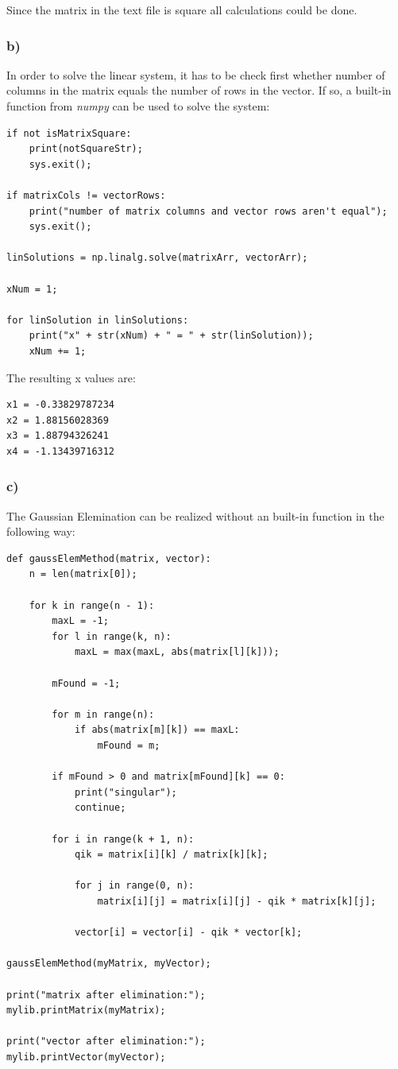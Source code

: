 Since the matrix in the text file is square all calculations could be done.


\subsubsection{b)}

In order to solve the linear system, it has to be check first whether number of columns in the matrix equals the number of rows in the vector. If so, a built-in function from \textit{numpy} can be used to solve the system:

\begin{lstlisting}[caption=Problem 1.1 b)]
if not isMatrixSquare:
	print(notSquareStr);
	sys.exit();

if matrixCols != vectorRows:
	print("number of matrix columns and vector rows aren't equal");
	sys.exit();

linSolutions = np.linalg.solve(matrixArr, vectorArr);

xNum = 1;

for linSolution in linSolutions:
	print("x" + str(xNum) + " = " + str(linSolution));
	xNum += 1;
\end{lstlisting}

The resulting x values are:

\begin{lstlisting}[caption=Result of 1.1 b), keywordstyle=\color{black}]
x1 = -0.33829787234
x2 = 1.88156028369
x3 = 1.88794326241
x4 = -1.13439716312
\end{lstlisting}


\subsubsection{c)}

The Gaussian Elemination can be realized without an built-in function in the following way:

\begin{lstlisting}[caption=Problem 1.1 c)]
def gaussElemMethod(matrix, vector):
	n = len(matrix[0]);
	
	for k in range(n - 1):
		maxL = -1;
		for l in range(k, n):
			maxL = max(maxL, abs(matrix[l][k]));
		
		mFound = -1;
		
		for m in range(n):
			if abs(matrix[m][k]) == maxL:
				mFound = m;
		
		if mFound > 0 and matrix[mFound][k] == 0:
			print("singular");
			continue;
		
		for i in range(k + 1, n):
			qik = matrix[i][k] / matrix[k][k];
			
			for j in range(0, n):
				matrix[i][j] = matrix[i][j] - qik * matrix[k][j];
			
			vector[i] = vector[i] - qik * vector[k];

gaussElemMethod(myMatrix, myVector);

print("matrix after elimination:");
mylib.printMatrix(myMatrix);

print("vector after elimination:");
mylib.printVector(myVector);
\end{lstlisting}

